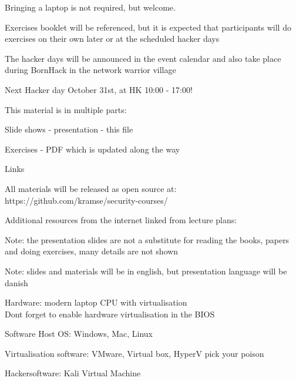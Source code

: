 \documentclass[Screen16to9,17pt]{foils}
\begin{document}

\begin{list2}
\item Bringing a laptop is not required, but welcome.
\item Exercises booklet will be referenced, but it is expected that participants will do exercises on their own later or at the scheduled hacker days
\item The hacker days will be announced in the event calendar and also take
place during BornHack in the network warrior village
\end{list2}

Next Hacker day October 31st, at HK 10:00 - 17:00!


\begin{list1}
\item This material is in multiple parts:
\begin{list2}
\item Slide shows - presentation - this file
\item Exercises - PDF which is updated along the way
\end{list2}
\item Links
\begin{list2}
\item All materials will be released as open source at:\\
https://github.com/kramse/security-courses/
\item Additional resources from the internet linked from lecture plans:\\
\item Note: the presentation slides are not a substitute for reading the books, papers and doing exercises, many details are not shown
\end{list2}
\end{list1}

Note: slides and materials will be in english, but presentation language will be danish




\begin{list2}
\item Hardware: modern laptop CPU with virtualisation\\
Dont forget to enable hardware virtualisation in the BIOS
\item Software Host OS: Windows, Mac, Linux
\item Virtualisation software: VMware, Virtual box, HyperV pick your poison
\item Hackersoftware: Kali Virtual Machine 
\end{list2}
\end{document}
